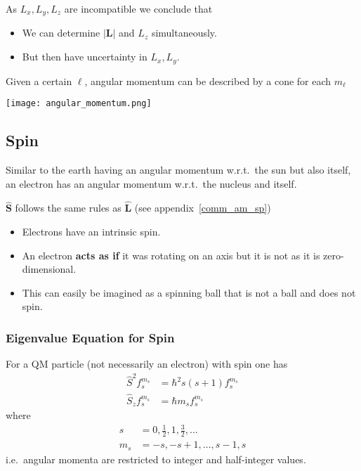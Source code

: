 \newpar{}
As $L_x, L_y, L_z$ are incompatible we conclude that
\begin{itemize}
    \item We can determine $|\mathbf{L}|$ and $L_{z}$ simultaneously.
    \item But then have uncertainty in $L_x, L_y$.
\end{itemize}
Given a certain $\ell$, angular momentum can be described by a cone for each $m_\ell$
\begin{center}
    \texttt{[image: angular\_momentum.png]}
\end{center}

\subsection{Spin}
Similar to the earth having an angular momentum w.r.t.\ the sun but also itself, an electron has an angular momentum w.r.t.\ the nucleus and itself.


$\widehat{\mathbf{S}}$ follows the same rules as $\widehat{\mathbf{L}}$ (see appendix\ \ref{comm_am_sp})


\begin{itemize}
    \item Electrons have an intrinsic spin.
    \item An electron \textbf{acts as if} it was rotating on an axis but it is not as it is zero-dimensional.
    \item This can easily be imagined as a spinning ball that is not a ball and does not spin.
\end{itemize}


\subsubsection{Eigenvalue Equation for Spin}
For a QM particle (not necessarily an electron) with spin one has
\begin{align*}
    \widehat{S}^2f_{s}^{m_s}   & =\hbar^{2}s (s+1) f_{s}^{m_s} \\
    \widehat{S}_{z}f_{s}^{m_s} & =\hbar m_s f_{s}^{m_s}
\end{align*}
where
\begin{align*}
    s   & =0,\frac{1}{2},1,\frac{3}{2},\dots \\
    m_s & =-s, -s+1,\dots, s-1, s
\end{align*}
i.e.\ angular momenta are restricted to integer and half-integer values.

